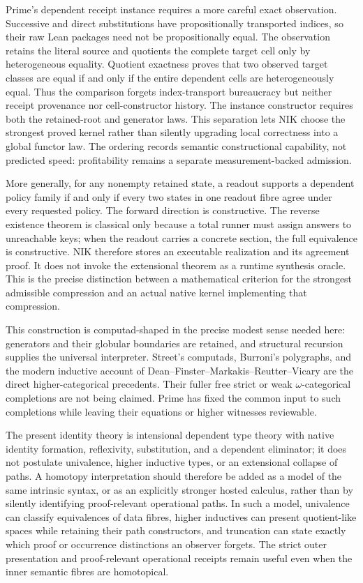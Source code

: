 \documentclass[11pt]{article}
\begin{document}
Prime's dependent receipt instance requires a more careful exact observation.
Successive and direct substitutions have propositionally transported indices,
so their raw Lean packages need not be propositionally equal.  The observation
retains the literal source and quotients the complete target cell only by
heterogeneous equality.  Quotient exactness proves that two observed target
classes are equal if and only if the entire dependent cells are heterogeneously
equal.  Thus the comparison forgets index-transport bureaucracy but neither
receipt provenance nor cell-constructor history.  The instance constructor
requires both the retained-root and generator laws.  This separation lets NIK
choose the strongest proved kernel rather than silently upgrading local
correctness into a global functor law.  The ordering records semantic
constructional capability, not predicted speed: profitability remains a
separate measurement-backed admission.

More generally, for any nonempty retained state, a readout supports a dependent
policy family if and only if every two states in one readout fibre agree under
every requested policy.  The forward direction is constructive.  The reverse
existence theorem is classical only because a total runner must assign answers
to unreachable keys; when the readout carries a concrete section, the full
equivalence is constructive.  NIK therefore stores an executable realization
and its agreement proof.  It does not invoke the extensional theorem as a
runtime synthesis oracle.  This is the precise distinction between a
mathematical criterion for the strongest admissible compression and an actual
native kernel implementing that compression.

This construction is computad-shaped in the precise modest sense needed here:
generators and their globular boundaries are retained, and structural recursion
supplies the universal interpreter.  Street's computads, Burroni's polygraphs,
and the modern inductive account of Dean--Finster--Markakis--Reutter--Vicary are
the direct higher-categorical precedents.  Their fuller free strict or weak
$\omega$-categorical completions are not being claimed.  Prime has fixed the
common input to such completions while leaving their equations or higher
witnesses reviewable.

The present identity theory is intensional dependent type theory with native
identity formation, reflexivity, substitution, and a dependent eliminator; it
does not postulate univalence, higher inductive types, or an extensional collapse
of paths.  A homotopy interpretation should therefore be added as a model of the
same intrinsic syntax, or as an explicitly stronger hosted calculus, rather than
by silently identifying proof-relevant operational paths.  In such a model,
univalence can classify equivalences of data fibres, higher inductives can
present quotient-like spaces while retaining their path constructors, and
truncation can state exactly which proof or occurrence distinctions an observer
forgets.  The strict outer presentation and proof-relevant operational receipts
remain useful even when the inner semantic fibres are homotopical.
\end{document}
